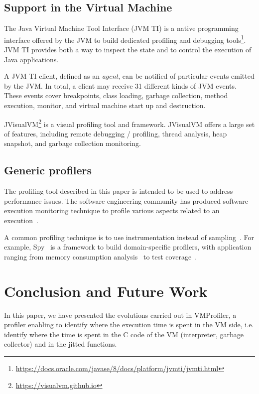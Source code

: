 \documentclass[10pt,preprint,nonatbib]{sigplanconf}
\newcommand{\seclabel}[1]{\label{sec:#1}}
\begin{document}
\subsection{Support in the Virtual Machine}

The Java Virtual Machine Tool Interface (JVM TI) is a native programming interface offered by the JVM to build dedicated profiling and debugging tools\footnote{\url{https://docs.oracle.com/javase/8/docs/platform/jvmti/jvmti.html}}. JVM TI provides both a way to inspect the state and to control the execution of Java applications. %

A JVM TI client, defined as an \emph{agent}, can be notified of particular events emitted by the JVM. In total, a client may receive 31 different kinds of JVM events. These events cover breakpoints, class loading, garbage collection, method execution, monitor, and virtual machine start up and destruction.

JVisualVM\footnote{\url{https://visualvm.github.io}} is a visual profiling tool and framework. JVisualVM offers a large set of features, including remote debugging / profiling, thread analysis, heap snapshot, and garbage collection monitoring. 

\subsection{Generic profilers}

The profiling tool described in this paper is intended to be used to address performance issues. The software engineering community has produced software execution monitoring technique to profile various aspects related to an execution~\cite{Ress12a,Ress12b}. 

A common profiling technique is to use instrumentation instead of sampling~\cite{Metz05a}. For example, Spy~\cite{Berg11h} is a framework to build domain-specific profilers, with application ranging from memory consumption analysis~\cite{Infa15a} to test coverage~\cite{Berg12c}.


\section{Conclusion and Future Work}\seclabel{conclusion}

In this paper, we have presented the evolutions carried out in VMProfiler, a profiler enabling to identify where the execution time is spent in the VM side, i.e. identify where the time is spent in the C code of the VM (interpreter, garbage collector) and in the jitted functions.
\end{document}

